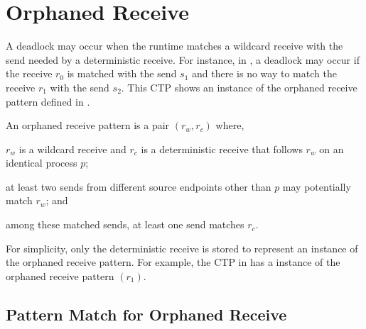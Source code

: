 \section{Orphaned Receive}


\examplefigone

A deadlock may occur when the runtime matches a wildcard receive with the send needed by a deterministic receive. For instance, in , a deadlock may occur if the receive $\mathit{r_{0}}$ is matched with the send $\mathit{s_{1}}$ and there is no way to match the receive $\mathit{r_{1}}$ with the send $\mathit{s_{2}}$. This CTP shows an instance of the orphaned receive pattern defined in .

\begin{definition}
An orphaned receive pattern is a pair $(\mathit{r_w}, \mathit{r_c})$ where, 
\begin{compactenum}
\item $\mathit{r_w}$ is a wildcard receive and $\mathit{r_c}$ is a deterministic receive that follows $\mathit{r_w}$ on an identical process $\mathit{p}$;
\item at least two sends from different source endpoints other than $\mathit{p}$ may potentially match $\mathit{r_w}$; and
\item among these matched sends, at least one send matches $\mathit{r_c}$. 
\end{compactenum}
\label{def:mismatch}
\end{definition}

For simplicity, only the deterministic receive is stored to represent an instance of the orphaned receive pattern. For example, the CTP in  has a instance of the orphaned receive pattern $(r_1)$.

\subsection{Pattern Match for Orphaned Receive}

